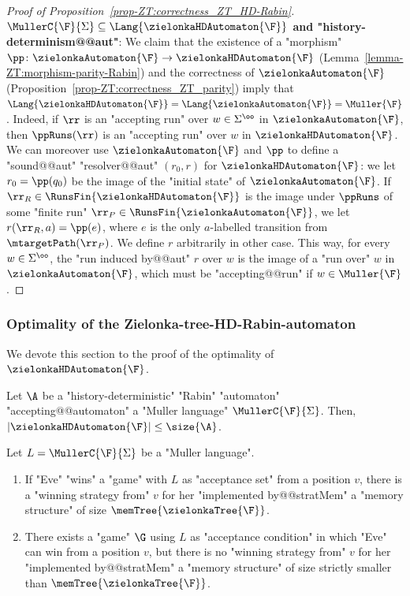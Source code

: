\documentclass[10pt,a4paper]{amsart}
\renewcommand{\SS}{\Sigma}
\begin{document}
\begin{proof}[Proof of Proposition~\ref{prop-ZT:correctness_ZT_HD-Rabin}]
	\textbf{$\MullerC{\F}{\SS} \subseteq \Lang{\zielonkaHDAutomaton{\F}}$ and "history-determinism@@aut"}:	
	We claim that the existence of a "morphism" $\pp\colon \zielonkaAutomaton{\F} \to \zielonkaHDAutomaton{\F}$ (Lemma~\ref{lemma-ZT:morphism-parity-Rabin}) and the correctness of $\zielonkaAutomaton{\F}$ (Proposition~\ref{prop-ZT:correctness_ZT_parity}) imply that $\Lang{\zielonkaHDAutomaton{\F}} = \Lang{\zielonkaAutomaton{\F}} = \Muller{\F}$. Indeed, if $\rr$ is an "accepting run" over $w\in \SS^\oo$ in $\zielonkaAutomaton{\F}$, then $\ppRuns(\rr)$  is an "accepting run" over $w$ in $\zielonkaHDAutomaton{\F}$.
	We can moreover use $\zielonkaAutomaton{\F}$ and $\pp$ to define a "sound@@aut" "resolver@@aut" $(r_0,r)$ for $\zielonkaHDAutomaton{\F}$: we let $r_0 = \pp(q_0)$ be the image of the "initial state" of $\zielonkaAutomaton{\F}$. If $\rr_R\in \RunsFin{\zielonkaHDAutomaton{\F}}$ is the image under $\ppRuns$ of some "finite run" $\rr_P\in \RunsFin{\zielonkaAutomaton{\F}}$, we let $r(\rr_R, a) = \pp(e)$, where $e$ is the only $a$-labelled transition from $\mtargetPath(\rr_P)$. We define $r$ arbitrarily in other case. This way, for every $w\in \SS^\oo$, the "run induced by@@aut" $r$ over $w$ is the image of a "run over" $w$ in $\zielonkaAutomaton{\F}$, which must be "accepting@@run" if $w\in \Muller{\F}$.
\end{proof}

\subsubsection{Optimality of the Zielonka-tree-HD-Rabin-automaton}\label{subsubsec-zt-HD: optimality}

We devote this section to the proof of the optimality of $\zielonkaHDAutomaton{\F}$.

\begin{theorem}\label{thm-zt:optimality_ZT-HD-Rabin}
	Let $\A$ be a "history-deterministic" "Rabin" "automaton" "accepting@@automaton" a "Muller language" $\MullerC{\F}{\SS}$. Then, $ |\zielonkaHDAutomaton{\F}|\leq \size{\A}$.
\end{theorem}


\begin{proposition}\label{prop-ZT:mem-ZT-DJW}
	Let $L = \MullerC{\F}{\SS}$ be a "Muller language". 
	\begin{enumerate}
		\item If "Eve" "wins" a "game" with $L$ as "acceptance set" from a position $v$, there is a "winning strategy from" $v$ for her "implemented by@@stratMem" a "memory structure" of size $\memTree{\zielonkaTree{\F}}$.
		\item There exists a "game" $\G$ using $L$ as "acceptance condition" in which "Eve" can win from a position $v$, but there is no "winning strategy from" $v$ for her "implemented by@@stratMem" a "memory structure" of size strictly smaller than $\memTree{\zielonkaTree{\F}}$.
	\end{enumerate}
\end{proposition}
\end{document}
